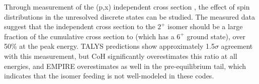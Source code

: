 Through measurement of the  (p,x) independent cross section
, the effect of spin distributions in the unresolved discrete
states can be studied.
The measured data suggest that the independent cross section to the $2^+$ isomer should be a large fraction of the cumulative cross section to  (which has a $6^+$ ground state), over 50\% at the peak energy.
TALYS predictions show approximately 1.5$\sigma$ agreement with this measurement, but CoH significantly overestimates this ratio at all energies, and EMPIRE overestimates as well in the pre-equilibrium tail,   
which indicates that the isomer feeding is not well-modeled in these codes.






% 

